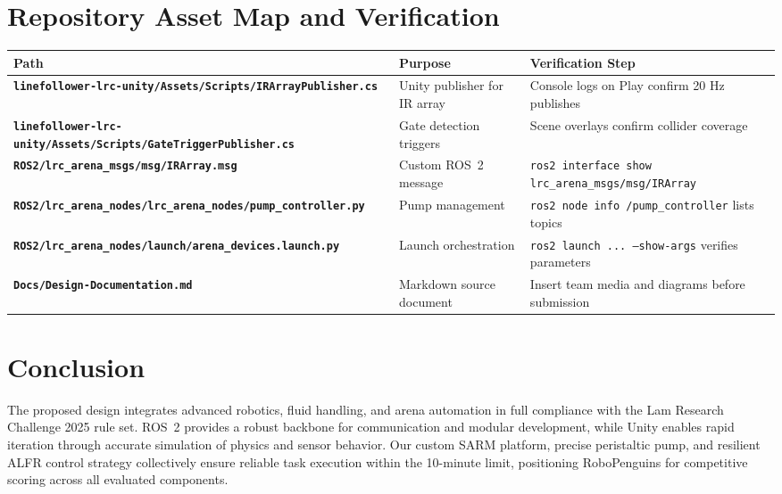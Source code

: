 \documentclass[12pt]{article}
\begin{document}
\section{Repository Asset Map and Verification}
\begin{tabularx}{\textwidth}{>{\bfseries}lYY}
\toprule
Path & Purpose & Verification Step \\
\midrule
\texttt{linefollower-lrc-unity/Assets/Scripts/IRArrayPublisher.cs} & Unity publisher for IR array & Console logs on Play confirm 20 Hz publishes \\
\texttt{linefollower-lrc-unity/Assets/Scripts/GateTriggerPublisher.cs} & Gate detection triggers & Scene overlays confirm collider coverage \\
\texttt{ROS2/lrc\_arena\_msgs/msg/IRArray.msg} & Custom ROS~2 message & \texttt{ros2 interface show lrc\_arena\_msgs/msg/IRArray} \\
\texttt{ROS2/lrc\_arena\_nodes/lrc\_arena\_nodes/pump\_controller.py} & Pump management & \texttt{ros2 node info /pump\_controller} lists topics \\
\texttt{ROS2/lrc\_arena\_nodes/launch/arena\_devices.launch.py} & Launch orchestration & \texttt{ros2 launch ... --show-args} verifies parameters \\
\texttt{Docs/Design-Documentation.md} & Markdown source document & Insert team media and diagrams before submission \\
\bottomrule
\end{tabularx}

\section{Conclusion}
The proposed design integrates advanced robotics, fluid handling, and arena automation in full compliance with the Lam Research Challenge 2025 rule set. ROS~2 provides a robust backbone for communication and modular development, while Unity enables rapid iteration through accurate simulation of physics and sensor behavior. Our custom SARM platform, precise peristaltic pump, and resilient ALFR control strategy collectively ensure reliable task execution within the 10-minute limit, positioning RoboPenguins for competitive scoring across all evaluated components.
\end{document}
